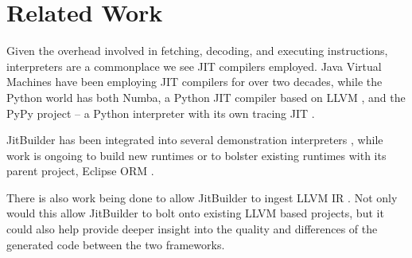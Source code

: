 \section{Related Work}
\label{sec:related-work}
Given the overhead involved in fetching, decoding, and executing instructions, interpreters are a commonplace we see JIT compilers employed.
Java Virtual Machines \cite{HiPerfJava,SuganumaIBMJit} have been employing JIT compilers for over two decades, while the Python world has both
Numba, a Python JIT compiler based on LLVM \cite{numba,numbaWeb}, and the PyPy project -- a Python interpreter with its own tracing JIT \cite{pypy}.

JitBuilder has been integrated into several demonstration interpreters \cite{lua-vermhela, wasmjit, base9}, while work is ongoing to build new runtimes or to bolster existing runtimes with its parent project, Eclipse ORM \cite{ruby-omr}.

There is also work being done to allow JitBuilder to ingest LLVM IR \cite{llvm-jitbuilder-interop}. 
Not only would this allow JitBuilder to bolt onto existing LLVM based projects, but it could also help provide deeper insight into the quality and differences of the generated code between the two frameworks.





